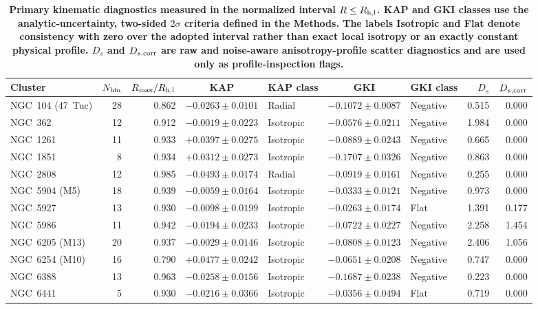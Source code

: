 \begin{table}
\centering
\caption{\textbf{Primary kinematic diagnostics measured in the normalized interval $R\leq R_{\rm h,l}$. KAP and GKI classes use the analytic-uncertainty, two-sided $2\sigma$ criteria defined in the Methods. The labels Isotropic and Flat denote consistency with zero over the adopted interval rather than exact local isotropy or an exactly constant physical profile. $D_s$ and $D_{s,\rm corr}$ are raw and noise-aware anisotropy-profile scatter diagnostics and are used only as profile-inspection flags.}}
\label{tab:results}
\footnotesize
\setlength{\tabcolsep}{3.5pt}
\begin{tabular}{lrrclclrr}
\hline
Cluster & $N_{\rm bin}$ & $R_{\max}/R_{\rm h,l}$ & KAP & KAP class & GKI & GKI class & $D_s$ & $D_{s,\rm corr}$ \\
\hline
NGC~104 (47~Tuc) & 28 & 0.862 & $-0.0263\pm0.0101$ & Radial & $-0.1072\pm0.0087$ & Negative & 0.515 & 0.000 \\
NGC~362 & 12 & 0.912 & $-0.0019\pm0.0223$ & Isotropic & $-0.0576\pm0.0211$ & Negative & 1.984 & 0.000 \\
NGC~1261 & 11 & 0.933 & $+0.0397\pm0.0275$ & Isotropic & $-0.0889\pm0.0243$ & Negative & 0.665 & 0.000 \\
NGC~1851 & 8 & 0.934 & $+0.0312\pm0.0273$ & Isotropic & $-0.1707\pm0.0326$ & Negative & 0.863 & 0.000 \\
NGC~2808 & 12 & 0.985 & $-0.0493\pm0.0174$ & Radial & $-0.0919\pm0.0161$ & Negative & 0.255 & 0.000 \\
NGC~5904 (M5) & 18 & 0.939 & $-0.0059\pm0.0164$ & Isotropic & $-0.0333\pm0.0121$ & Negative & 0.973 & 0.000 \\
NGC~5927 & 13 & 0.930 & $-0.0098\pm0.0199$ & Isotropic & $-0.0263\pm0.0174$ & Flat & 1.391 & 0.177 \\
NGC~5986 & 11 & 0.942 & $-0.0194\pm0.0233$ & Isotropic & $-0.0722\pm0.0227$ & Negative & 2.258 & 1.454 \\
NGC~6205 (M13) & 20 & 0.937 & $-0.0029\pm0.0146$ & Isotropic & $-0.0808\pm0.0123$ & Negative & 2.406 & 1.056 \\
NGC~6254 (M10) & 16 & 0.790 & $+0.0477\pm0.0242$ & Isotropic & $-0.0651\pm0.0208$ & Negative & 0.747 & 0.000 \\
NGC~6388 & 13 & 0.963 & $-0.0258\pm0.0156$ & Isotropic & $-0.1687\pm0.0238$ & Negative & 0.223 & 0.000 \\
NGC~6441 & 5 & 0.930 & $-0.0216\pm0.0366$ & Isotropic & $-0.0356\pm0.0494$ & Flat & 0.719 & 0.000 \\

\end{tabular}
\end{table}
